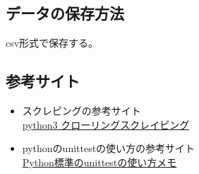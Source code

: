 \documentclass{jsarticle}
\begin{document}
  \subsection{データの保存方法}
    csv形式で保存する。

  \subsection{参考サイト}
    \begin{itemize}
      \item スクレピングの参考サイト\\
      \href{https://qiita.com/penguinz222/items/6a30d026ede2e822e245}{python3 クローリングスクレイピング}
      \item pythonのunittestの使い方の参考サイト\\
      \href{https://qiita.com/aomidro/items/3e3449fde924893f18ca}{Python標準のunittestの使い方メモ}

    \end{itemize}
\end{document}
